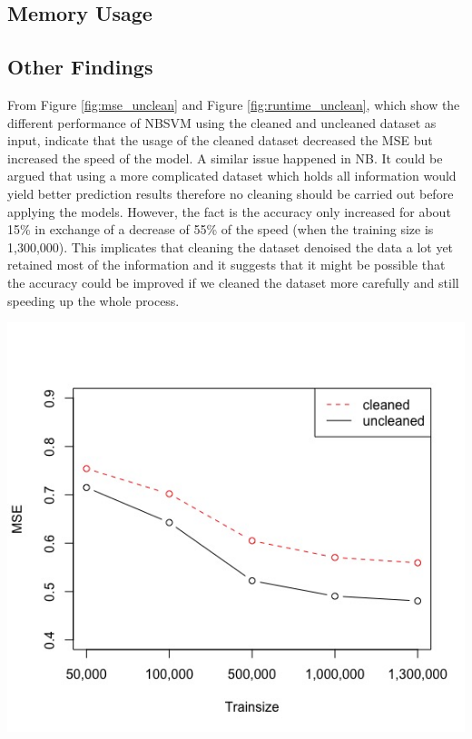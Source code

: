 \documentclass[letterpaper]{article} %
\begin{document}
\subsection{Memory Usage}


\subsection{Other Findings}
From Figure \ref{fig:mse_unclean} and Figure \ref{fig:runtime_unclean}, which show the different performance of NBSVM using the cleaned and uncleaned dataset as input, indicate that the usage of the cleaned dataset decreased the MSE but increased the speed of the model. A similar issue happened in NB. It could be argued that using a more complicated dataset which holds all information would yield better prediction results therefore no cleaning should be carried out before applying the models. However, the fact is the accuracy only increased for about 15\% in exchange of a decrease of 55\% of the speed (when the training size is 1,300,000). This implicates that cleaning the dataset denoised the data a lot yet retained most of the information and it suggests that it might be possible that the accuracy could be improved if we cleaned the dataset more carefully and still speeding up the whole process. 

\begin{center}
\centering
\includegraphics[width=\columnwidth]{../Plots/NBSVM_unclean_clean.jpeg}
\label{fig:mse_unclean}
\end{center}
\end{document}
